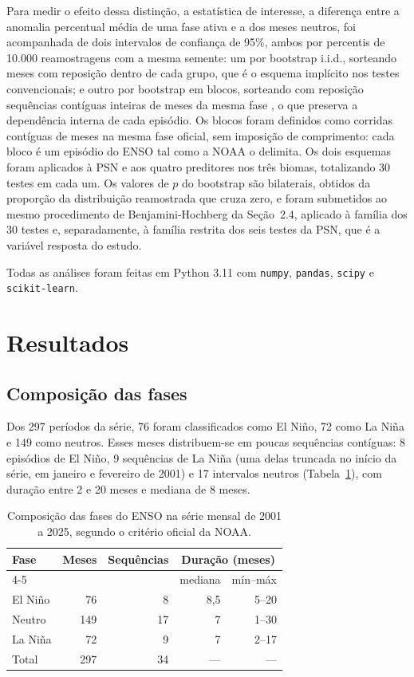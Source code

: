 \documentclass[a4paper,fleqn]{cas-sc}
\begin{document}
Para medir o efeito dessa distinção, a estatística de interesse, a diferença entre a anomalia percentual média de uma fase ativa e a dos meses neutros, foi acompanhada de dois intervalos de confiança de 95\%, ambos por percentis de 10.000 reamostragens com a mesma semente: um por bootstrap i.i.d., sorteando meses com reposição dentro de cada grupo, que é o esquema implícito nos testes convencionais; e outro por bootstrap em blocos, sorteando com reposição sequências contíguas inteiras de meses da mesma fase \citep{kunsch1989, politis1994}, o que preserva a dependência interna de cada episódio. Os blocos foram definidos como corridas contíguas de meses na mesma fase oficial, sem imposição de comprimento: cada bloco é um episódio do ENSO tal como a NOAA o delimita. Os dois esquemas foram aplicados à PSN e aos quatro preditores nos três biomas, totalizando 30 testes em cada um. Os valores de $p$ do bootstrap são bilaterais, obtidos da proporção da distribuição reamostrada que cruza zero, e foram submetidos ao mesmo procedimento de Benjamini-Hochberg da Seção~2.4, aplicado à família dos 30 testes e, separadamente, à família restrita dos seis testes da PSN, que é a variável resposta do estudo.

Todas as análises foram feitas em Python 3.11 com \texttt{numpy}, \texttt{pandas}, \texttt{scipy} e \texttt{scikit-learn}.

\section{Resultados}

\subsection{Composição das fases}

Dos 297 períodos da série, 76 foram classificados como El Niño, 72 como La Niña e 149 como neutros. Esses meses distribuem-se em poucas sequências contíguas: 8 episódios de El Niño, 9 sequências de La Niña (uma delas truncada no início da série, em janeiro e fevereiro de 2001) e 17 intervalos neutros (Tabela~\ref{tab:fases}), com duração entre 2 e 20 meses e mediana de 8 meses.

\begin{table}[width=\linewidth,cols=5,pos=h]
\caption{Composição das fases do ENSO na série mensal de 2001 a 2025, segundo o critério oficial da NOAA.}
\label{tab:fases}
\begin{tabular*}{\tblwidth}{@{}lrrrr@{}}
\toprule
Fase & Meses & Sequências & \multicolumn{2}{c}{Duração (meses)} \\
\cmidrule(l){4-5}
 & & & mediana & mín--máx \\
\midrule
El Niño & 76  & 8  & 8,5 & 5--20 \\
Neutro  & 149 & 17 & 7   & 1--30 \\
La Niña & 72  & 9  & 7   & 2--17 \\
\midrule
Total   & 297 & 34 & --- & --- \\
\bottomrule
\end{tabular*}
\end{table}
\end{document}
